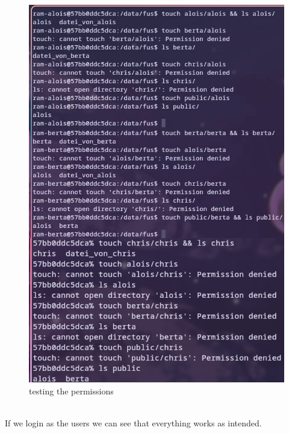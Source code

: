 \documentclass[a4paper]{article}
\begin{document}
\begin{figure}[h]
	\centering
	\includegraphics[scale=1.2]{images/testing_perms.png}
	\caption{testing the permissions}
\end{figure} \\
If we login as the users we can see that everything works as intended.
\newpage
\end{document}
